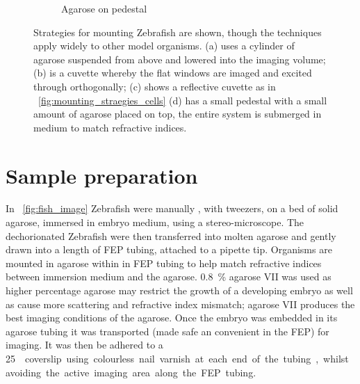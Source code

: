 \begin{figure}
\begin{subfigure}[b]{0.4\linewidth}
         \caption{Agarose on pedestal}
    \end{subfigure}
    \caption{Strategies for mounting Zebrafish are shown, though the techniques apply widely to other model organisms.
    (a) uses a cylinder of agarose suspended from above and lowered into the imaging volume;
    (b) is a cuvette whereby the flat windows are imaged and excited through orthogonally;
    (c) shows a reflective cuvette as in \figurename~\ref{fig:mounting_straegies_cells}
    (d) has a small pedestal with a small amount of agarose placed on top, the entire system is submerged in medium to match refractive indices.}
    \label{fig:mounting_straegies_fish}
\end{figure}



\section{Sample preparation}

In \figurename~\ref{fig:fish_image} \gls{Zebrafish} were manually , with tweezers, on a bed of solid agarose, immersed in embryo medium, using a stereo-microscope.
The dechorionated Zebrafish were then transferred into molten agarose and gently drawn into a length of \gls{FEP} tubing, attached to a pipette tip.
Organisms are mounted in agarose within in \gls{FEP} tubing to help match refractive indices between immersion medium and the agarose.
\SI{0.8}{\percent} \gls{agarose VII} was used as higher percentage agarose may restrict the growth of a developing embryo as well as cause more scattering and refractive index mismatch; \gls{agarose VII} produces the best imaging conditions of the agarose\cite{4}.
Once the embryo was embedded in its agarose tubing it was transported (made safe an convenient in the \gls{FEP}) for imaging.
It was then be adhered to a \SI{25}{\milli\metre\square} coverslip using colourless nail varnish at each end of the tubing, whilst avoiding the active imaging area along the \gls{FEP} tubing.

